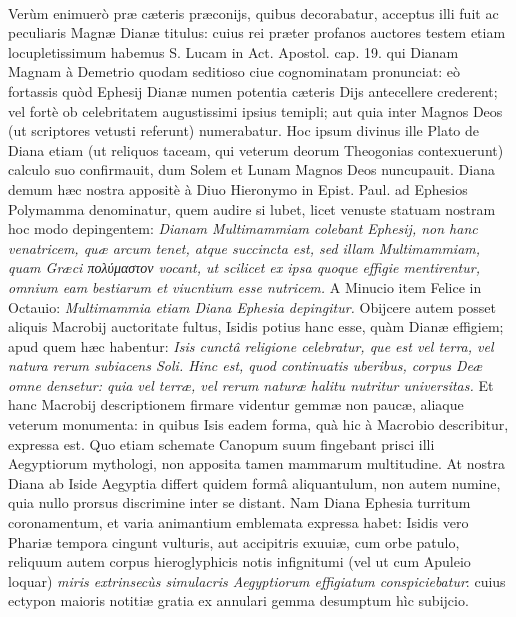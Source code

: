 \documentclass[a4paper, 11pt, oneside, polutonikogreek, latin]{article}
\begin{document}
\paragraph{}
Verùm enimuerò præ cæteris præconijs, quibus decorabatur, acceptus illi fuit ac peculiaris Magnæ Dianæ titulus: cuius rei præter profanos auctores testem etiam locupletissimum habemus S. Lucam in Act. Apostol. cap. 19. qui Dianam Magnam à Demetrio quodam seditioso ciue cognominatam pronunciat: eò fortassis quòd Ephesij Dianæ numen potentia cæteris Dijs antecellere crederent; vel fortè ob celebritatem augustissimi ipsius temipli; aut quia inter Magnos Deos (ut scriptores vetusti referunt) numerabatur. Hoc ipsum divinus ille Plato de Diana etiam (ut reliquos taceam, qui veterum deorum Theogonias contexuerunt) calculo suo confirmauit, dum Solem et Lunam Magnos Deos nuncupauit. Diana demum hæc nostra appositè à Diuo Hieronymo in Epist. Paul. ad Ephesios Polymamma denominatur, quem audire si lubet, licet venuste statuam nostram hoc modo depingentem: \emph{Dianam Multimammiam colebant Ephesij, non hanc venatricem, quæ arcum tenet, atque succincta est, sed illam Multimammiam, quam Græci πολύμαστον vocant, ut scilicet ex ipsa quoque effigie mentirentur, omnium eam bestiarum et viucntium esse nutricem.} A Minucio item Felice in Octauio: \emph{Multimammia etiam Diana Ephesia depingitur.} Obijcere autem posset aliquis Macrobij auctoritate fultus, Isidis potius hanc esse, quàm Dianæ effigiem; apud quem hæc habentur: \emph{Isis cunctâ religione celebratur, que est vel terra, vel natura rerum subiacens Soli. Hinc est, quod continuatis uberibus, corpus Deæ omne densetur: quia vel terræ, vel rerum naturæ halitu nutritur universitas.} Et hanc Macrobij descriptionem firmare videntur gemmæ non paucæ, aliaque veterum monumenta: in quibus Isis eadem forma, quà hic à Macrobio describitur, expressa est. Quo etiam schemate Canopum suum fingebant prisci illi Aegyptiorum mythologi, non apposita tamen mammarum multitudine. At nostra Diana ab Iside Aegyptia differt quidem formâ aliquantulum, non autem numine, quia nullo prorsus discrimine inter se distant. Nam Diana Ephesia turritum coronamentum, et varia animantium emblemata expressa habet: Isidis vero Phariæ tempora cingunt vulturis, aut accipitris exuuiæ, cum orbe patulo, reliquum autem corpus hieroglyphicis notis infignitumi (vel ut cum Apuleio loquar) \emph{miris extrinsecùs simulacris Aegyptiorum effigiatum conspiciebatur}: cuius ectypon maioris notitiæ gratia ex annulari gemma desumptum hìc subijcio.
\end{document}
